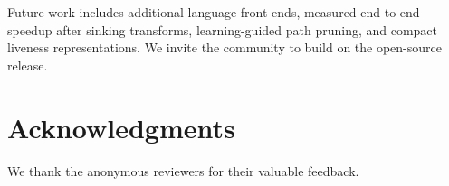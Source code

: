 \documentclass[acmsmall,screen,review,anonymous]{acmart}
\begin{document}
Future work includes additional language front-ends, measured end-to-end speedup after sinking transforms, learning-guided path pruning, and compact liveness representations. We invite the community to build on the open-source release.

\section*{Acknowledgments}
We thank the anonymous reviewers for their valuable feedback. 


\balance



\end{document}

